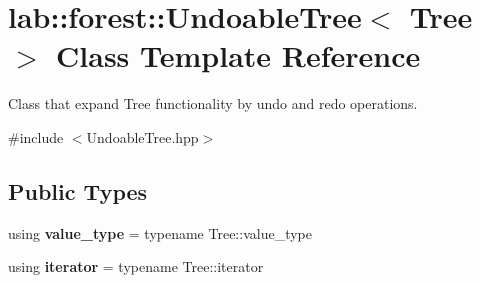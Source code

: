 \hypertarget{classlab_1_1forest_1_1UndoableTree}{}\section{lab\+:\+:forest\+:\+:Undoable\+Tree$<$ Tree $>$ Class Template Reference}
\label{classlab_1_1forest_1_1UndoableTree}


Class that expand Tree functionality by undo and redo operations.  




{\ttfamily \#include $<$Undoable\+Tree.\+hpp$>$}

\subsection*{Public Types}
\begin{DoxyCompactItemize}
\item 
\mbox{\label{classlab_1_1forest_1_1UndoableTree_aaf637f922a0a607faf87df1122c16275}} 
using {\bfseries value\+\_\+type} = typename Tree\+::value\+\_\+type
\item 
\mbox{\label{classlab_1_1forest_1_1UndoableTree_ab044c0d5b07e9eb29aae99c7d275de0d}} 
using {\bfseries iterator} = typename Tree\+::iterator
\end{DoxyCompactItemize}
